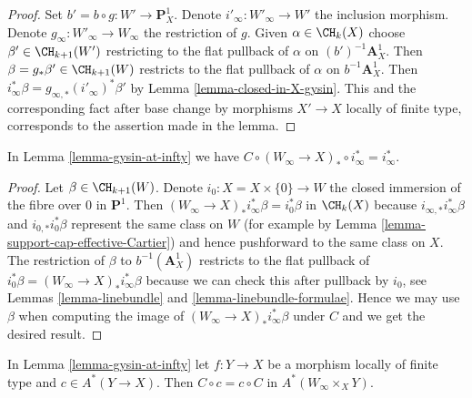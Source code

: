 \begin{proof}
Set $b' = b \circ g : W' \to \mathbf{P}^1_X$. Denote
$i'_\infty : W'_\infty \to W'$ the inclusion morphism.
Denote $g_\infty : W'_\infty \to W_\infty$ the restriction of $g$.
Given $\alpha \in \CH_k(X)$ choose $\beta' \in \CH_{k + 1}(W')$
restricting to the flat pullback of $\alpha$ on $(b')^{-1}\mathbf{A}^1_X$.
Then $\beta = g_*\beta' \in \CH_{k + 1}(W)$ restricts to the
flat pullback of $\alpha$ on $b^{-1}\mathbf{A}^1_X$.
Then $i_\infty^*\beta = g_{\infty, *}(i'_\infty)^*\beta'$
by Lemma \ref{lemma-closed-in-X-gysin}.
This and the corresponding fact after base change by
morphisms $X' \to X$ locally of finite type, corresponds
to the assertion made in the lemma.
\end{proof}

\begin{lemma}
\label{lemma-homomorphism-pre}
In Lemma \ref{lemma-gysin-at-infty} we have
$C \circ (W_\infty \to X)_* \circ i_\infty^* = i_\infty^*$.
\end{lemma}

\begin{proof}
Let $\beta \in \CH_{k + 1}(W)$. Denote $i_0 : X = X \times \{0\} \to W$
the closed immersion of the fibre over $0$ in $\mathbf{P}^1$. Then
$(W_\infty \to X)_* i_\infty^* \beta = i_0^*\beta$ in $\CH_k(X)$ because
$i_{\infty, *}i_\infty^*\beta$ and $i_{0, *}i_0^*\beta$
represent the same class on $W$ (for example by
Lemma \ref{lemma-support-cap-effective-Cartier})
and hence pushforward to the same class on $X$.
The restriction of $\beta$ to $b^{-1}(\mathbf{A}^1_X)$
restricts to the flat pullback of
$i_0^*\beta = (W_\infty \to X)_* i_\infty^* \beta$ because we can check
this after pullback by $i_0$, see
Lemmas \ref{lemma-linebundle} and \ref{lemma-linebundle-formulae}.
Hence we may use $\beta$ when computing the image of
$(W_\infty \to X)_*i_\infty^*\beta$ under $C$
and we get the desired result.
\end{proof}

\begin{lemma}
\label{lemma-gysin-at-infty-commutes}
In Lemma \ref{lemma-gysin-at-infty} let $f : Y \to X$ be a morphism
locally of finite type and $c \in A^*(Y \to X)$. Then $C \circ c = c \circ C$
in $A^*(W_\infty \times_X Y)$.
\end{lemma}

